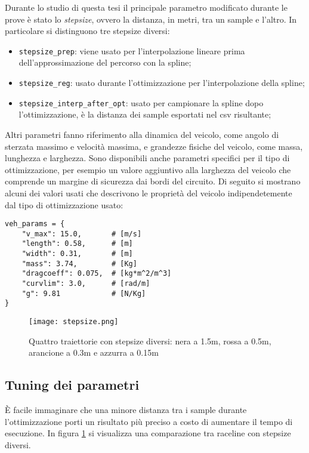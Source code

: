 Durante lo studio di questa tesi il principale parametro modificato durante le prove è stato lo
\textit{stepsize}, ovvero la distanza, in metri, tra un sample e l'altro. In particolare si distinguono
tre stepsize diversi:
\begin{itemize}
	\item \verb|stepsize_prep|: viene usato per l'interpolazione lineare prima dell'approssimazione del
		percorso con la spline;
	\item \verb|stepsize_reg|: usato durante l'ottimizzazione per l'interpolazione della spline;
	\item \verb|stepsize_interp_after_opt|: usato per campionare la spline dopo l'ottimizzazione, è la
		distanza dei sample esportati nel csv risultante;
\end{itemize}
Altri parametri fanno riferimento alla dinamica del veicolo, come angolo di sterzata massimo e velocità
massima, e grandezze fisiche del veicolo, come massa, lunghezza e larghezza. Sono disponibili anche
parametri specifici per il tipo di ottimizzazione, per esempio un valore aggiuntivo alla larghezza del
veicolo che comprende un margine di sicurezza dai bordi del circuito. Di seguito si mostrano alcuni dei
valori usati che descrivono le proprietà del veicolo indipendetemente dal tipo di ottimizzazione usato:

\begin{lstlisting}
veh_params = {
	"v_max": 15.0,       # [m/s]
	"length": 0.58,      # [m]
	"width": 0.31,       # [m]
	"mass": 3.74,        # [Kg]
	"dragcoeff": 0.075,  # [kg*m^2/m^3]
	"curvlim": 3.0,      # [rad/m]
	"g": 9.81            # [N/Kg]
}
\end{lstlisting}

\begin{figure}[h]
	\begin{center}
		\texttt{[image: stepsize.png]}
	\end{center}
	\caption{Quattro traiettorie con stepsize diversi: nera a 1.5m, rossa a 0.5m,
	arancione a 0.3m e azzurra a 0.15m}
	\label{fig:stepsize}
\end{figure}

\subsection{Tuning dei parametri}
\label{par:tuning}
È facile immaginare che una minore distanza tra i sample durante l'ottimizzazione porti un risultato
più preciso a costo di aumentare il tempo di esecuzione. %
In figura \ref{fig:stepsize} si visualizza una comparazione tra raceline con stepsize diversi.

